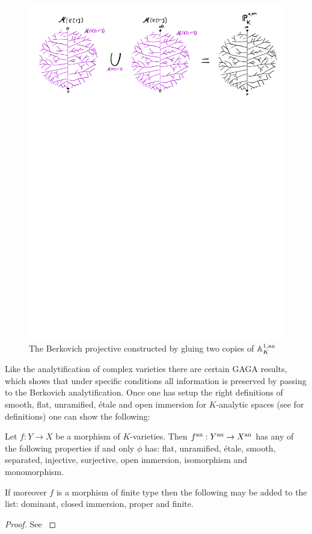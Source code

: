 \begin{figure}[h]
	\centering
	\includegraphics[width=\textwidth]{figures/projective_line}
	\caption{The Berkovich projective constructed by gluing two copies of $\mathbb{A}^{1, \text{an}}_K$}
	\label{fig:berk_projective_line}
\end{figure}


Like the analytification of complex varieties there are certain GAGA results, which shows that under specific conditions all information is preserved by passing to the Berkovich analytification. 
Once one has setup the right definitions of smooth, flat, unramified, étale and open immersion for $K$-analytic spaces (see \cite[][sec. 3.1]{berkovichSpectralTheoryAnalytic2012} for definitions) one can show the following:
\begin{theorem}
	Let $f: Y \to X$  be a morphism of $K$-varieties. Then $f{}^{\text{an}}: Y {}^{\text{an}} \to X{}^{\text{an}}$ has any of the following properties if and only $\phi$ has: flat, unramified, étale, smooth, separated, injective, surjective, open immersion, isomorphism and monomorphism. 

	If moreover $f$ is a morphism of finite type then the following may be added to the list: dominant, closed immersion, proper and finite. 
\end{theorem}
\begin{proof}
	See \cite[][prop.\ 3.4.6 and prop.\ 3.4.7]{berkovichSpectralTheoryAnalytic2012}
\end{proof}

